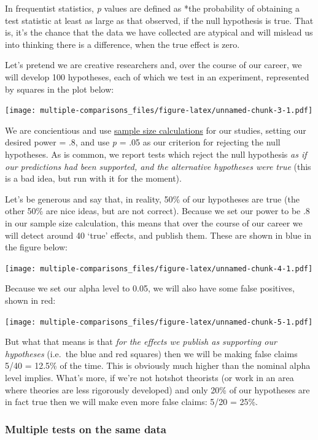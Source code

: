 \documentclass[]{article}
\begin{document}
In frequentist statistics, \emph{p} values are defined as *the probability of
obtaining a test statistic at least as large as that observed, if the null
hypothesis is true. That is, it's the chance that the data we have collected are
atypical and will mislead us into thinking there is a difference, when the true
effect is zero.

Let's pretend we are creative researchers and, over the course of our career, we
will develop 100 hypotheses, each of which we test in an experiment, represented
by squares in the plot below:

\texttt{[image: multiple-comparisons\_files/figure-latex/unnamed-chunk-3-1.pdf]}

We are concientious and use \protect\hyperlink{power}{sample size calculations} for our studies,
setting our desired power = .8, and use \emph{p} = .05 as our criterion for rejecting
the null hypotheses. As is common, we report tests which reject the null
hypothesis \emph{as if our predictions had been supported, and the alternative
hypotheses were true} (this is a bad idea, but run with it for the moment).

Let's be generous and say that, in reality, 50\% of our hypotheses are true (the
other 50\% are nice ideas, but are not correct). Because we set our power to be
.8 in our sample size calculation, this means that over the course of our career
we will detect around 40 `true' effects, and publish them. These are shown in
blue in the figure below:

\texttt{[image: multiple-comparisons\_files/figure-latex/unnamed-chunk-4-1.pdf]}

Because we set our alpha level to 0.05, we will also have some false positives,
shown in red:

\texttt{[image: multiple-comparisons\_files/figure-latex/unnamed-chunk-5-1.pdf]}

But what that means is that \emph{for the effects we publish as supporting our
hypotheses} (i.e.~the blue and red squares) then we will be making false claims
5/40 = 12.5\% of the time. This is obviously much higher than the nominal alpha
level implies. What's more, if we're not hotshot theorists (or work in an area
where theories are less rigorously developed) and only 20\% of our hypotheses are
in fact true then we will make even more false claims: 5/20 = 25\%.

\hypertarget{multiple-tests-on-the-same-data}{%
\subsubsection*{Multiple tests on the same data}\label{multiple-tests-on-the-same-data}}
\end{document}
